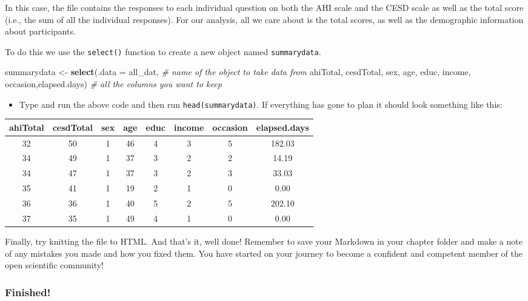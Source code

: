 \documentclass[]{book}
\newenvironment{Shaded}{\begin{snugshade}}{\end{snugshade}}
\newcommand{\CommentTok}[1]{\textcolor[rgb]{0.56,0.35,0.01}{\textit{#1}}}
\newcommand{\DataTypeTok}[1]{\textcolor[rgb]{0.13,0.29,0.53}{#1}}
\newcommand{\KeywordTok}[1]{\textcolor[rgb]{0.13,0.29,0.53}{\textbf{#1}}}
\newcommand{\NormalTok}[1]{#1}
\newcommand{\StringTok}[1]{\textcolor[rgb]{0.31,0.60,0.02}{#1}}
\providecommand{\tightlist}{%
  \setlength{\itemsep}{0pt}\setlength{\parskip}{0pt}}
\begin{document}
In this case, the file contains the responses to each individual question on both the AHI scale and the CESD scale as well as the total score (i.e., the sum of all the individual responses). For our analysis, all we care about is the total scores, as well as the demographic information about participants.

To do this we use the \texttt{select()} function to create a new object named \texttt{summarydata}.

\begin{Shaded}
\begin{Highlighting}[]
\NormalTok{summarydata <-}\StringTok{ }\KeywordTok{select}\NormalTok{(}\DataTypeTok{.data =}\NormalTok{ all_dat, }\CommentTok{# name of the object to take data from}
\NormalTok{                      ahiTotal, cesdTotal, sex, age, educ, income, occasion,elapsed.days) }\CommentTok{# all the columns you want to keep}
\end{Highlighting}
\end{Shaded}

\begin{itemize}
\tightlist
\item
  Type and run the above code and then run \texttt{head(summarydata)}. If everything has gone to plan it should look something like this:
\end{itemize}

\begin{tabular}{c|c|c|c|c|c|c|c}
\hline
ahiTotal & cesdTotal & sex & age & educ & income & occasion & elapsed.days\\
\hline
32 & 50 & 1 & 46 & 4 & 3 & 5 & 182.03\\
\hline
34 & 49 & 1 & 37 & 3 & 2 & 2 & 14.19\\
\hline
34 & 47 & 1 & 37 & 3 & 2 & 3 & 33.03\\
\hline
35 & 41 & 1 & 19 & 2 & 1 & 0 & 0.00\\
\hline
36 & 36 & 1 & 40 & 5 & 2 & 5 & 202.10\\
\hline
37 & 35 & 1 & 49 & 4 & 1 & 0 & 0.00\\
\hline
\end{tabular}

Finally, try knitting the file to HTML. And that's it, well done! Remember to save your Markdown in your chapter folder and make a note of any mistakes you made and how you fixed them. You have started on your journey to become a confident and competent member of the open scientific community!

\hypertarget{finished-1}{%
\subsubsection{Finished!}\label{finished-1}}
\end{document}
